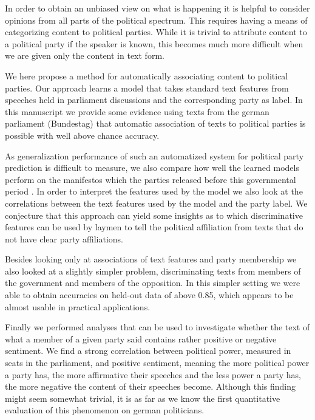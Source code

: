 \documentclass{article} %
\begin{document}
In order to obtain an unbiased view on what is happening it is helpful to consider opinions from all parts of the political spectrum. This requires having a means of categorizing content to political parties. While it is trivial to attribute content to a political party if the speaker is known, this becomes much more difficult when we are given only the content in text form. 

We here propose a method for automatically associating content to political parties. Our approach learns a model that takes standard text features from speeches held in parliament discussions and the corresponding party as label. In this manuscript we provide some evidence using texts from the german parliament (Bundestag) \cite{plenarprotokolle} that automatic association of texts to political parties is possible with well above chance accuracy. 

As generalization performance of such an automatized system for political party prediction is difficult to measure, we also compare how well the learned models perform on the manifestos which the parties released before this governmental period \cite{linke_parteiprogramm, gruene_parteiprogramm,spd_parteiprogramm, cdu_parteiprogramm}. In order to interpret the features used by the model we also look at the correlations between the text features used by the model and the party label. We conjecture that this approach can yield some insights as to which discriminative features can be used by laymen to tell the political affiliation from texts that do not have clear party affiliations. 

Besides looking only at associations of text features and party membership we also looked at a slightly simpler problem, discriminating texts from members of the government and members of the opposition. In this simpler setting we were able to obtain accuracies on held-out data of above 0.85, which appears to be almost usable in practical applications. 

Finally we performed analyses that can be used to investigate whether the text of what a member of a given party said contains rather positive or negative sentiment. We find a strong correlation between political power, measured in seats in the parliament, and positive sentiment, meaning the more political power a party has, the more affirmative their speeches and the less power a party has, the more negative the content of their speeches become. Although this finding might seem somewhat trivial, it is as far as we know the first quantitative evaluation of this phenomenon on german politicians. 
\end{document}
